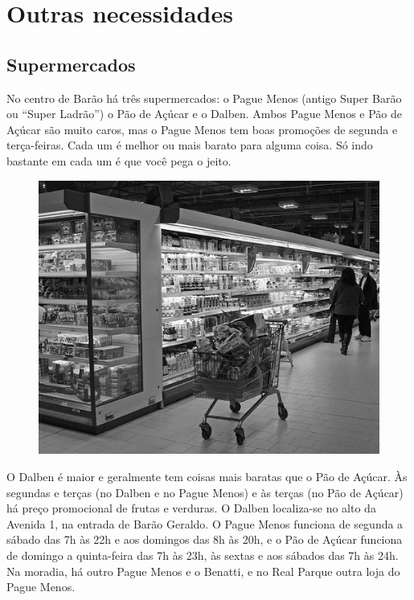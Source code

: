 
\section{Outras necessidades}
\subsection{Supermercados}

No centro de Barão há três supermercados: o Pague Menos (antigo Super Barão ou
``Super Ladrão'') o Pão de Açúcar e o Dalben. Ambos Pague Menos e Pão de Açúcar são
muito caros, mas o Pague Menos tem boas promoções de segunda e terça-feiras. Cada
um é melhor ou mais barato para alguma coisa. Só indo bastante em cada um é que
você pega o jeito.

\begin{figure}[h!]
    \centering
    \includegraphics[scale=0.42,keepaspectratio=true]{img/imgs/9-outras_necessidades/supermercado.jpg}
\end{figure}

O Dalben é maior e geralmente tem coisas mais baratas que o Pão de Açúcar. Às
segundas e terças (no Dalben e no Pague Menos) e às terças (no Pão de Açúcar) há
preço promocional de frutas e verduras. O Dalben localiza-se no alto da Avenida
1, na entrada de Barão Geraldo. O Pague Menos funciona de segunda a sábado das 7h às
22h e aos domingos das 8h às 20h, e o Pão de Açúcar funciona de domingo
a quinta-feira das 7h às 23h, às sextas e aos sábados das 7h às 24h. Na moradia, há
outro Pague Menos e o Benatti, e no Real Parque outra loja do Pague Menos.

